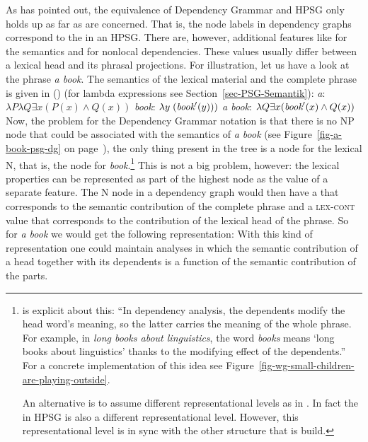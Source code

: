 As \citet{Oliva2003a} has pointed out, the equivalence of Dependency Grammar and HPSG only holds up as far
as \headvs are concerned.
That is, the node labels in dependency graphs correspond to the \headvs in
an HPSG. There are, however, additional features like \cont for the semantics and \slasch for
nonlocal dependencies. These values usually differ between a lexical head and its phrasal
projections. For illustration, let us have a look at the phrase \emph{a book}. The semantics of the
lexical material and the complete phrase is given in () (for lambda expressions see Section~\ref{sec-PSG-Semantik}):
\eal
\ex \emph{a}: $\lambda P \lambda Q \exists x (P(x) \wedge Q(x))$
\ex \emph{book}: $\lambda y\;(\textit{book}'(y)))$
\ex \emph{a book}: $\lambda Q \exists x (\textit{book}'(x) \wedge Q(x))$
\zl
Now, the problem for the Dependency Grammar notation is that there is no NP node that could be
associated with the semantics of \emph{a book} (see Figure~\ref{fig-a-book-psg-dg} on page~\pageref{fig-a-book-psg-dg}), the only thing present in the tree is a node for the
lexical N, that is, the node for \emph{book}.\footnote{
  \citet[--392]{Hudson2003a}\indexwg is explicit about this: ``In dependency analysis, the dependents modify the head
    word's meaning, so the latter carries the meaning of the whole phrase. For example, in
    \emph{long books about linguistics}, the word \emph{books} means `long books about linguistics'
    thanks to the modifying effect of the dependents.'' For a concrete implementation of this idea
    see Figure~\vref{fig-wg-small-children-are-playing-outside}.

   An alternative is to assume different representational levels as in \mtt \citep{Melcuk81a}. In fact the \contv in
   HPSG is also a different representational level. However, this representational level is in sync
   with the other structure that is build.
} This is not a big problem, however: the lexical
properties can be represented as part of the highest node as the value of a separate feature. The N
node in a dependency graph would then have a \contv that corresponds to the semantic contribution of
the complete phrase and a \textsc{lex-cont} value that corresponds to the contribution of the lexical
head of the phrase. So for \emph{a book} we would get the following representation:
\ea
{}
\z
With this kind of representation one could maintain analyses in which the semantic contribution of a
head together with its dependents is a function of the semantic contribution of the parts. 

